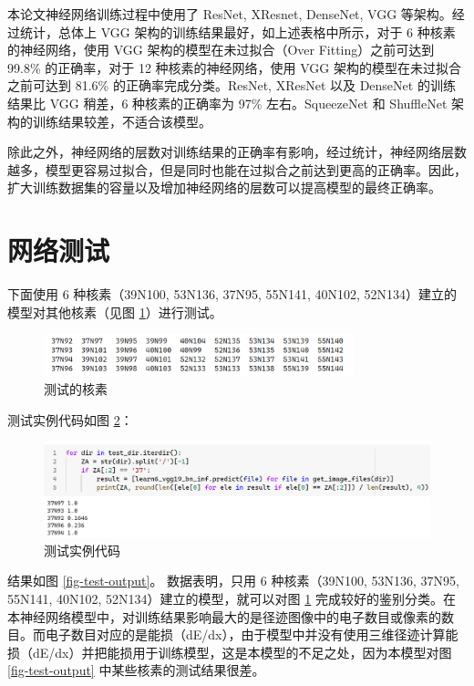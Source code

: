 \documentclass[AutoFakeBold]{LZUThesis}
\begin{document}
本论文神经网络训练过程中使用了 ResNet, XResnet, DenseNet, VGG 等架构。经过统计，总体上 VGG 架构的训练结果最好，如上述表格中所示，对于 6 种核素的神经网络，使用 VGG 架构的模型在未过拟合（Over Fitting）之前可达到 99.8\% 的正确率，对于 12 种核素的神经网络，使用 VGG 架构的模型在未过拟合之前可达到 81.6\% 的正确率完成分类。ResNet, XResNet 以及 DenseNet 的训练结果比 VGG 稍差，6 种核素的正确率为 97\% 左右。SqueezeNet 和 ShuffleNet 架构的训练结果较差，不适合该模型。

除此之外，神经网络的层数对训练结果的正确率有影响，经过统计，神经网络层数越多，模型更容易过拟合，但是同时也能在过拟合之前达到更高的正确率。因此，扩大训练数据集的容量以及增加神经网络的层数可以提高模型的最终正确率。



\section{网络测试}
下面使用 6 种核素（39N100, 53N136, 37N95, 55N141, 40N102, 52N134）建立的模型对其他核素（见图 \ref{fig-other-nuclides}）进行测试。


\begin{figure}[H]
    \centering
    \includegraphics[width=0.8\textwidth]{figures/other-nuclides.png}
    \caption{测试的核素}
    \label{fig-other-nuclides}
\end{figure}

测试实例代码如图 \ref{fig-test-code}：

\begin{figure}[H]
    \centering
    \includegraphics[width=1.0\textwidth]{figures/test-code.png}
    \caption{测试实例代码}
    \label{fig-test-code}
\end{figure}


结果如图 \ref{fig-test-output}。
数据表明，只用 6 种核素（39N100, 53N136, 37N95, 55N141, 40N102, 52N134）建立的模型，就可以对图 \ref{fig-other-nuclides} 完成较好的鉴别分类。在本神经网络模型中，对训练结果影响最大的是径迹图像中的电子数目或像素的数目。而电子数目对应的是能损（dE/dx），由于模型中并没有使用三维径迹计算能损（dE/dx）并把能损用于训练模型，这是本模型的不足之处，因为本模型对图 \ref{fig-test-output} 中某些核素的测试结果很差。
\end{document}
